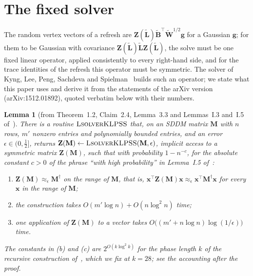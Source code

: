\documentclass[11pt]{article}
\newtheorem{lemma}[theorem]{Lemma}
\theoremstyle{remark}
\newcommand{\BB}{\mathbf B}
\newcommand{\BBtil}{{\widetilde{\BB}}}
\renewcommand{\gg}{{\mathbf g}}
\newcommand{\LL}{\mathbf L}
\newcommand{\LLtil}{{\widetilde{\LL}}}
\newcommand{\MM}{\mathbf M}
\newcommand{\WW}{\mathbf W}
\newcommand{\WWtil}{{\widetilde{\WW}}}
\newcommand{\xx}{\mathbf x}
\newcommand{\ZZ}{\mathbf Z}
\begin{document}
\clearpage
\section{The fixed solver}\label{sec:solver}

The random vertex vectors of a refresh are
$\ZZ(\LLtil)\BBtil^{\top}\WWtil^{1/2}\gg$ for a Gaussian $\gg$; for them to be
Gaussian with covariance
$\ZZ(\LLtil)\LLtil\ZZ(\LLtil)$, the solve must be one fixed linear operator,
applied consistently to every right-hand side, and for the trace
identities of the refresh this operator must be symmetric.
The solver of Kyng, Lee, Peng, Sachdeva and Spielman~\cite{KLPSS16:conf}
builds such an operator; we state what this paper uses and derive it from
the statements of the arXiv version (arXiv:1512.01892), quoted verbatim
below with their numbers.

\begin{lemma}[from Theorem~1.2, Claim~2.4, Lemma~3.3 and Lemmas~I.3
and~I.5 of~\cite{KLPSS16:conf}]\label{lem:chain}
There is a routine $\textsc{LsolverKLPSS}$ that, on an SDDM matrix $\MM$
with $n$ rows, $m'$ nonzero entries and polynomially bounded entries, and
an error $\epsilon\in(0,\frac12]$, returns
$\ZZ(\MM)\leftarrow\textsc{LsolverKLPSS}(\MM,\epsilon)$, implicit access to
a symmetric matrix $\ZZ(\MM)$, such that with probability $1-n^{-c}$, for
the absolute constant $c>0$ of the phrase ``with high probability'' in
Lemma~I.5 of~\cite{KLPSS16:conf}:
\begin{enumerate}[label=(\alph*),leftmargin=*]
\item $\ZZ(\MM)\approx_{\epsilon}\MM^{\dag}$ on the range of $\MM$, that
is, $\xx^{\top}\ZZ(\MM)\xx\approx_{\epsilon}\xx^{\top}\MM^{\dag}\xx$ for
every $\xx$ in the range of $\MM$;
\item the construction takes $O(m'\log n)+O(n\log^{2}n)$ time;
\item one application of $\ZZ(\MM)$ to a vector takes
$O\bigl((m'+n\log n)\log(1/\epsilon)\bigr)$ time.
\end{enumerate}
The constants in (b) and (c) are $2^{O(k\log^{2}k)}$ for the phase length
$k$ of the recursive construction of~\cite{KLPSS16:conf}, which we fix at
$k=28$; see the accounting after the proof.
\end{lemma}
\end{document}
